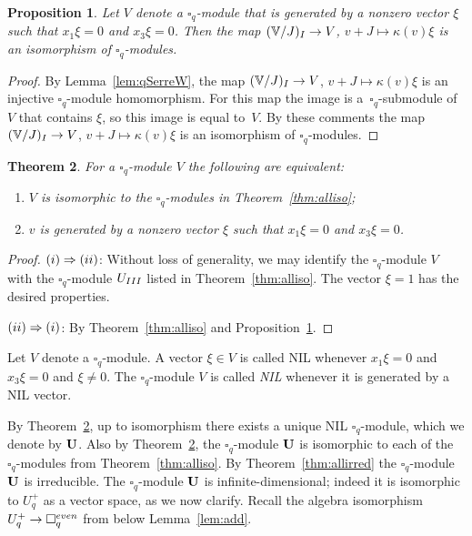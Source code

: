 \documentclass[11pt]{article}
\numberwithin{equation}{section}
\numberwithin{equation}{section}
\newtheorem{Theorem}{Theorem}[section]
\newtheorem{Proposition}[Theorem]{Proposition}
 { \theoremstyle{definition}
\newtheorem{Definition}[Theorem]{Definition}
\newtheorem{Example}[Theorem]{Example}
\newtheorem{Note}[Theorem]{Note}
}
\begin{document}
{\begin{Proposition}\label{prop:bij} Let $V$ denote a $\square_q$-module that is generated by a nonzero vector $\xi$ such that $x_1 \xi = 0 $ and $x_3 \xi = 0$. Then the map $(\mathbb V/J)_{\rm I} \to V$, $v+J \mapsto \kappa(v)\xi$ is an isomorphism of $\square_q$-modules.
\end{Proposition}
\begin{proof}By Lemma~\ref{lem:qSerreW}, the map $(\mathbb V/J)_{\rm I} \to V$, $v+J \mapsto \kappa(v)\xi$
is an injective $\square_q$-module homomorphism. For this map the image is a~$\square_q$-submodule of $V$ that contains $\xi$, so this image is equal to~$V$. By these comments the map $(\mathbb V/J)_{\rm I} \to V$, $v+J \mapsto \kappa(v)\xi$ is an isomorphism of $\square_q$-modules.
\end{proof}

\begin{Theorem}\label{thm:Uchar} For a $\square_q$-module $V$ the following are equivalent:
\begin{enumerate}\itemsep=0pt
\item[\rm (i)] $V$ is isomorphic to the $\square_q$-modules in Theorem~{\rm \ref{thm:alliso}};
\item[\rm (ii)] $v$ is generated by a nonzero vector $\xi$ such that $x_1 \xi = 0 $ and $x_3 \xi = 0$.
\end{enumerate}
\end{Theorem}
\begin{proof}${\rm (i)} \Rightarrow {\rm (ii)}$: Without loss of generality, we may identify the $\square_q$-module $V$ with the $\square_q$-module $U_{\rm III}$ listed in Theorem~\ref{thm:alliso}.
The vector $\xi=1$ has the desired properties.

${\rm (ii)} \Rightarrow {\rm (i)}$: By Theorem~\ref{thm:alliso} and Proposition~\ref{prop:bij}.
\end{proof}

\begin{Definition}Let $V$ denote a $\square_q$-module. A vector $\xi \in V$ is called {\rm NIL} whenever
$x_1 \xi = 0$ and $x_3 \xi = 0$ and $\xi \not= 0$. The $\square_q$-module $V$ is called {\it NIL} whenever it is generated by a NIL vector.
\end{Definition}

By Theorem~\ref{thm:Uchar}, up to isomorphism there exists a unique NIL $\square_q$-module, which we denote by $\bf U$. Also by Theorem~\ref{thm:Uchar}, the $\square_q$-module $\bf U$ is isomorphic to each of the
$\square_q$-modules from Theorem~\ref{thm:alliso}. By Theorem~\ref{thm:allirred} the $\square_q$-module $\bf U$ is irreducible. The $\square_q$-module $\bf U$ is infinite-dimensional; indeed it is isomorphic to $U^+_q$ as a vector space, as we now clarify. Recall the algebra isomorphism $U^+_q \to \square^{\rm even}_q$ from below Lemma~\ref{lem:add}.

}
\end{document}
